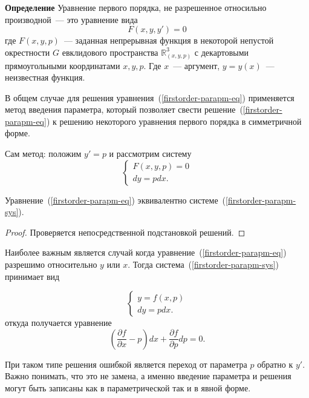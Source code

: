 \textbf{Определение} Уравнение первого порядка, не разрешенное относильно производной~--- это уравнение вида 
\begin{equation}\label{firstorder-parapm-eq}
    F(x, y, y') = 0
\end{equation}
где \(F(x, y, p)\)~--- заданная непрерывная функция в некоторой непустой окрестности $G$ евклидового пространства $\mathbb{R}_{(x, y, p)}^3$ с декартовыми прямоугольными координатами $x, y, p$. Где $x$~--- аргумент, $y = y(x)$~--- неизвестная функция.

В общем случае для решения уравнения~(\ref{firstorder-parapm-eq}) применяется метод введения параметра, который позволяет свести решение~(\ref{firstorder-parapm-eq}) к решению некоторого уравнения первого порядка в симметричной форме.

Сам метод: положим $y' = p$ и рассмотрим систему
\begin{equation}\label{firstorder-parapm-sys}
    \begin{cases}
    F(x, y, p) = 0 \\
    dy = pdx.
    \end{cases}
\end{equation}

\begin{theorem}[Не доказывалось]
Уравнение~(\ref{firstorder-parapm-eq}) эквивалентно системе~(\ref{firstorder-parapm-sys}).
\end{theorem}
\begin{proof}
Проверяется непосредственной подстановкой решений.
\end{proof}

Наиболее важным является случай когда уравнение~(\ref{firstorder-parapm-eq}) разрешимо относительно $y$ или $x$. Тогда система~(\ref{firstorder-parapm-sys}) принимает вид 

\begin{equation}\label{firstorder-parapm-sys-simp}
    \begin{cases}
    y = f(x, p) \\
    dy = pdx.
    \end{cases}
\end{equation}
откуда получается уравнение
\[\left(\frac{\partial f}{\partial x} - p\right) dx + \frac{\partial f}{\partial p} dp = 0.\]

\begin{lemmanote}
При таком типе решения ошибкой является переход от параметра $p$ обратно к $y'$. Важно понимать, что это не замена, а именно введение параметра и решения могут быть записаны как в параметрической так и в явной форме.
\end{lemmanote}

